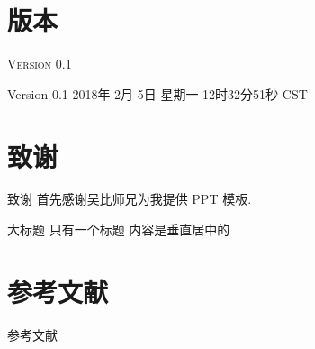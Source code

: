 \documentclass[no-math]{beamer}
\begin{document}
    \section{版本}
        \begin{frame}{\textsc{Version 0.1}}
            \begin{block}{Version 0.1}
                2018年 2月 5日 星期一 12时32分51秒 CST
            \end{block}
        \end{frame}

    \section{致谢}
        \begin{frame}{致谢}
            首先感谢吴比师兄为我提供 PPT 模板.
        \end{frame}
    \begin{frame}{大标题}
        只有一个标题
        内容是垂直居中的 \cite{Teney_2017_CVPR}
    \end{frame}

    \section{参考文献}
    \begin{frame}{参考文献}
        
        
    \end{frame}
\end{document}
